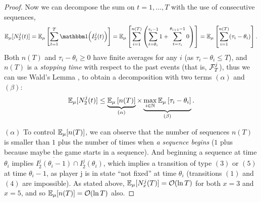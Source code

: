 \begin{proof}
  Now we can decompose the sum on $t=1,\dots,T$ with the use of consecutive sequences,
  \[
    \E_{\mu}[N_2^j(t)]
    = \E_{\mu}\left[ \sum_{t=1}^T \indic{\left(I_2^j(t)\right)} \right]
    =
    \E_{\mu}\left[ \sum_{i=1}^{n(T)} \left( \sum_{t=\theta_i}^{\tau_i - 1} 1 + \sum_{t=\tau_i}^{\theta_{i+1} - 1} 0 \right) \right]
    =
    \E_{\mu}\left[ \sum_{i=1}^{n(T)} (\tau_i - \theta_i) \right].
  \]
  Both $n(T)$ and $\tau_i - \theta_i \geq 0$ have finite averages for any $i$ (as $\tau_i - \theta_i \leq T$), and $n(T)$ is a \emph{stopping time} with respect to the past events (that is, $\mathcal{F}^j_T$),
  thus we can use Wald's Lemma \citep{Wald45},
  to obtain a decomposition with two terms $(\alpha)$ and $(\beta)$:
  \[
    \mathbb{E}_{\mu}[N_2^j(t)] \leq \underbrace{\mathbb{E}_{\mu}\left[ n(T) \right]}_{(\alpha)} \times \underbrace{\max_{i\in\mathbb{N}} \mathbb{E}_{\mu}\left[ \tau_i - \theta_i \right]}_{(\beta)}.
  \]

  $(\alpha)$ To control $\mathbb{E}_{\mu}[n(T)]$, we can observe that
  the number of sequences $n(T)$ is smaller than $1$ plus the number of times when \emph{a sequence begins} ($1$ plus because maybe the game starts in a sequence).
  And beginning a sequence
  at time $\theta_i$ implies
  $\overline{I_2^j(\theta_i-1)} \cap I_2^j(\theta_i)$,
  which implies a transition of type $(3)$ or $(5)$ at time $\theta_i - 1$, as player j is in state ``not fixed'' at time $\theta_i$ (transitions $(1)$ and $(4)$ are impossible).
  As stated above, $\mathbb{E}_{\mu}[N_x^j(T)] = \mathop{}\mathopen{}\mathcal{O}\mathopen{}\left(\ln T\right)$ for both $x=3$ and $x=5$,
  and so $\mathbb{E}_{\mu}[n(T)] = \mathop{}\mathopen{}\mathcal{O}\mathopen{}\left(\ln T\right)$ also.



\end{proof}
